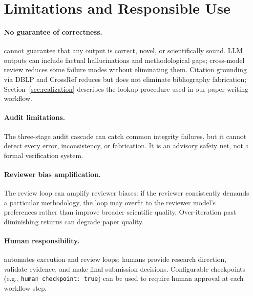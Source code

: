 \section{Limitations and Responsible Use}
\label{sec:limitations}

\paragraph{No guarantee of correctness.}
\aris{} cannot guarantee that any output is correct, novel, or scientifically sound.
LLM outputs can include factual hallucinations and methodological gaps; cross-model review reduces some failure modes without eliminating them.
Citation grounding via DBLP and CrossRef reduces but does not eliminate bibliography fabrication; Section~\ref{sec:realization} describes the lookup procedure used in our paper-writing workflow.

\paragraph{Audit limitations.}
The three-stage audit cascade can catch common integrity failures, but it cannot detect every error, inconsistency, or fabrication.
It is an advisory safety net, not a formal verification system.

\paragraph{Reviewer bias amplification.}
The review loop can amplify reviewer biases: if the reviewer consistently demands a particular methodology, the loop may overfit to the reviewer model's preferences rather than improve broader scientific quality.
Over-iteration past diminishing returns can degrade paper quality.

\paragraph{Human responsibility.}
\aris{} automates execution and review loops; humans provide research direction, validate evidence, and make final submission decisions.
Configurable checkpoints (e.g., \texttt{human checkpoint: true}) can be used to require human approval at each workflow step.

